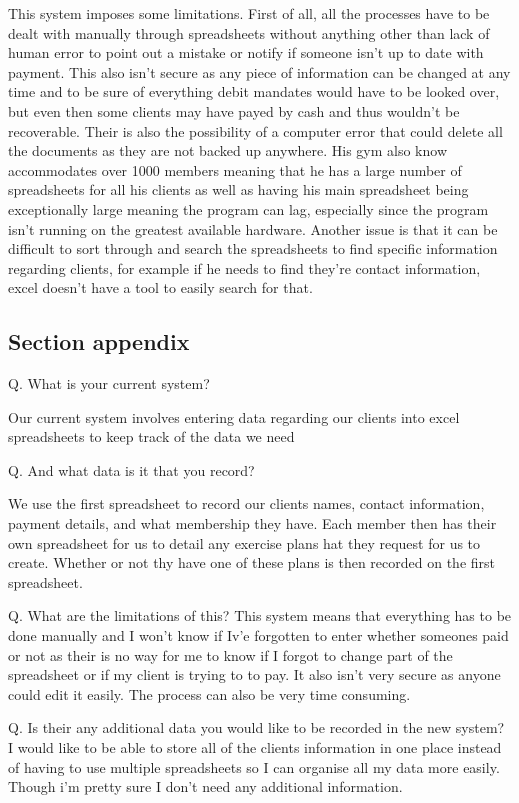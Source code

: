 This system imposes some limitations. First of all, all the processes have to be dealt with manually through spreadsheets without anything other than lack of human error to point out a mistake or notify if someone isn't up to date with payment. This also isn't secure as any piece of information can be changed at any time and to be sure of everything debit mandates would have to be looked over, but even then some clients may have payed by cash and thus wouldn't be recoverable. Their is also the possibility of a computer error that could delete all the documents as they are not backed up anywhere. His gym also know accommodates over 1000 members meaning that he has a large number of spreadsheets for all his clients as well as having his main spreadsheet being exceptionally large meaning the program can lag, especially since the program isn't running on the greatest available hardware. Another issue is that it can be difficult to sort through and search the spreadsheets to find specific information regarding clients, for example if he needs to find they're contact information, excel doesn't have a tool to easily search for that.

\subsection{Section appendix}

Q. What is your current system?

Our current system involves entering data regarding our clients into excel spreadsheets to keep track of the data we need

Q. And what data is it that you record?

We use the first spreadsheet to record our clients names, contact information, payment details, and what membership they have. Each member then has their own spreadsheet for us to detail any exercise plans hat they request for us to create. Whether or not thy have one of these plans is then recorded on the first spreadsheet.

Q. What are the limitations of this?
This system means that everything has to be done manually and I won't know if Iv'e forgotten to enter whether someones paid or not as their is no way for me to know if I forgot to change part of the spreadsheet or if my client is trying to to pay. It also isn't very secure as anyone could edit it easily. The process can also be very time consuming.

Q. Is their any additional data you would like to be recorded in the new system?
I would like to be able to store all of the clients information in one place instead of having to use multiple spreadsheets so I can organise all my data more easily. Though i'm pretty sure I don't need any additional information.

